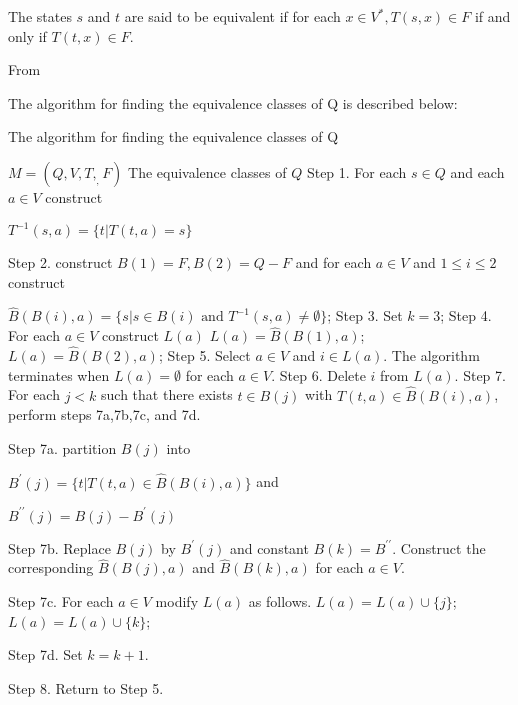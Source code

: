 \begin{definition}
	The states $s$ and $t$ are said to be equivalent if for each $x\in V^\ast, T(s,x)\in F$ if and only if $T(t,x)\in F$. 
\end{definition}

From \cite{Hopcroft71}

The algorithm for finding the equivalence classes of Q is described below:

\begin{algorithm}  
	\caption{The algorithm for finding the equivalence classes of Q}  
	\begin{algorithmic}%
		\Require $M=(Q,V,T,_,F)$  
		\Ensure The equivalence classes of $Q$  
		\State Step 1. For each $s\in Q$ and each $a\in V$ construct
		
		$T^{-1}(s,a)=\{t|T(t,a)=s\}$
		
		\State Step 2. construct $B(1)=F, B(2)=Q-F$ and for each $a\in V$ and $1\le i\le 2$ construct
		
				\State $\hat{B}(B(i),a)=\{s|s\in B(i) \text{ and } T^{-1}(s,a)\ne \emptyset\}$;
			\EndFor  
		\EndFor 
		\State Step 3. Set $k=3$;
		\State Step 4. For each $a\in V$ construct $L(a)$
				\State $L(a) = \hat{B}(B(1),a)$;
			\Else
	            \State $L(a) = \hat{B}(B(2),a)$; 
			\EndIf
		\EndFor
		\State Step 5. Select $a\in V$ and $i\in L(a)$. The algorithm terminates when $L(a)=\emptyset$ for each $a\in V$.
		\State Step 6. Delete $i$ from $L(a)$.
		\State Step 7. For each $j<k$ such that there exists $t\in B(j)$ with $T(t,a)\in \hat{B}(B(i),a)$, perform steps 7a,7b,7c, and 7d.
		
		\State Step 7a. partition $B(j)$ into
			
			$B^\prime(j)=\{t|T(t,a)\in \hat{B}(B(i),a)\}$ and			
		
			$B^{\prime\prime}(j)=B(j)-B^\prime(j)$
		
		\State Step 7b. Replace $B(j)$ by $B^\prime(j)$ and constant $B(k)=B^{\prime\prime}$. Construct the corresponding $\hat{B}(B(j),a)$ and $\hat{B}(B(k),a)$ for each $a\in V$.
		
		\State Step 7c. For each $a\in V$ modify $L(a)$ as follows.
				\State $L(a) = L(a)\cup \{j\}$;
			\Else
				\State $L(a) = L(a)\cup \{k\}$;
			\EndIf 
			
		\State Step 7d. Set $k=k+1$.
		
		\State Step 8. Return to Step 5.
	\end{algorithmic}   
\end{algorithm}

